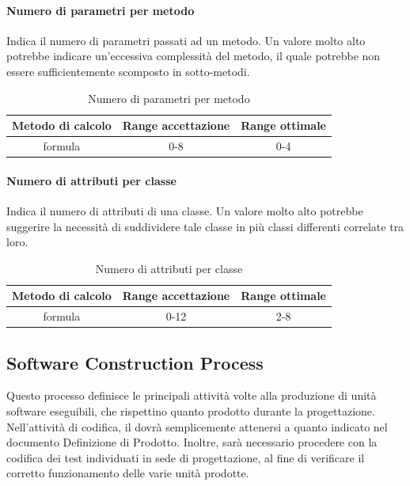 			\paragraph{Numero di parametri per metodo}
			Indica il numero di parametri passati ad un metodo.
			Un valore molto alto potrebbe indicare un'eccessiva complessità del metodo, il quale potrebbe non essere sufficientemente scomposto in sotto-metodi.
			\begin{table}[H]
				\begin{center}
					\begin{tabular}{|c|c|c|}
						\hline
						\textbf{Metodo di calcolo} & \textbf{Range accettazione} & \textbf{Range ottimale} \\
						\hline
						formula & 0-8  & 0-4 \\
						\hline
					\end{tabular}
				\end{center}
				\caption{Numero di parametri per metodo}
			\end{table}
		
			\paragraph{Numero di attributi per classe}
			Indica il numero di attributi di una classe.
			Un valore molto alto potrebbe suggerire la necessità di suddividere tale classe in più classi differenti correlate tra loro.
			\begin{table}[H]
				\begin{center}
					\begin{tabular}{|c|c|c|}
						\hline
						\textbf{Metodo di calcolo} & \textbf{Range accettazione} & \textbf{Range ottimale} \\
						\hline
						formula & 0-12  & 2-8 \\
						\hline
					\end{tabular}
				\end{center}
				\caption{Numero di attributi per classe}
			\end{table}
			
	\subsection{Software Construction Process}
	Questo processo definisce le principali attività volte alla produzione di unità software eseguibili, che
	rispettino quanto prodotto durante la progettazione.
	Nell’attività di codifica, il \textit{\Progr} dovrà semplicemente attenersi a quanto indicato nel documento Definizione di Prodotto. Inoltre, sarà necessario procedere con la codifica dei test individuati in sede di progettazione, al fine di verificare il corretto funzionamento delle varie unità prodotte.
		
